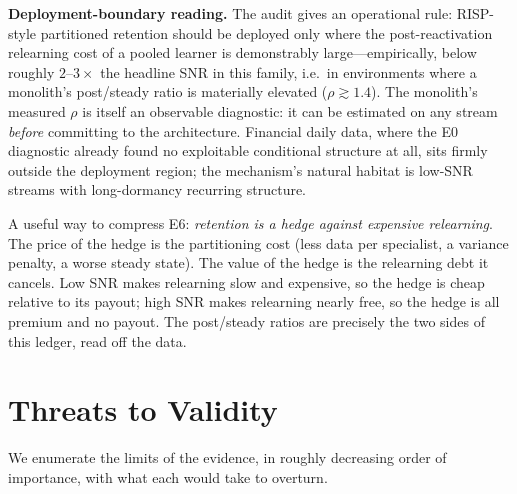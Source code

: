 \begin{keypoint}
\textbf{Deployment-boundary reading.} The audit gives an operational rule:
RISP-style partitioned retention should be deployed only where the
post-reactivation relearning cost of a pooled learner is demonstrably
large---empirically, below roughly $2$--$3\times$ the headline SNR in this
family, i.e.\ in environments where a monolith's post/steady ratio is
materially elevated ($\rho \gtrsim 1.4$). The monolith's measured $\rho$
is itself an observable diagnostic: it can be estimated on any stream
\emph{before} committing to the architecture. Financial daily data, where
the E0 diagnostic already found no exploitable conditional structure at
all, sits firmly outside the deployment region; the mechanism's natural
habitat is low-SNR streams with long-dormancy recurring structure.
\end{keypoint}

\begin{intuition}
A useful way to compress E6: \emph{retention is a hedge against expensive
relearning}. The price of the hedge is the partitioning cost (less data per
specialist, a variance penalty, a worse steady state). The value of the
hedge is the relearning debt it cancels. Low SNR makes relearning slow and
expensive, so the hedge is cheap relative to its payout; high SNR makes
relearning nearly free, so the hedge is all premium and no payout. The
post/steady ratios are precisely the two sides of this ledger, read off
the data.
\end{intuition}

\section{Threats to Validity}
\label{sec:dd5-threats}

We enumerate the limits of the evidence, in roughly decreasing order of
importance, with what each would take to overturn.

